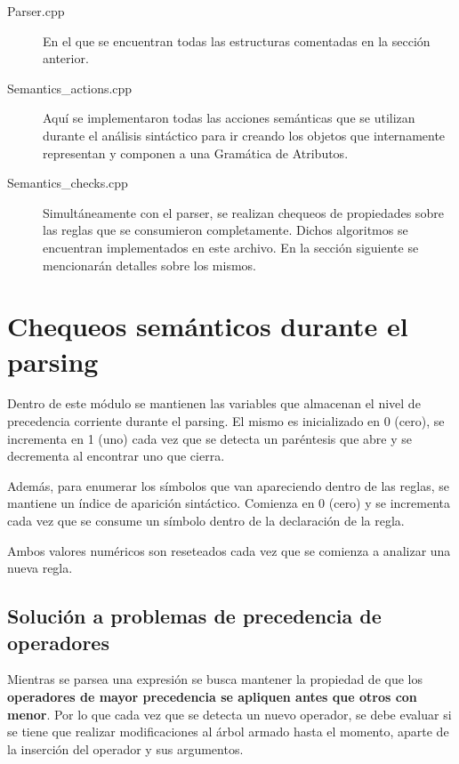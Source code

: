 \begin{description}
\item [Parser.cpp] En el que se encuentran todas las estructuras comentadas en la sección anterior.

\item [Semantics\_actions.cpp] Aquí se implementaron todas las acciones semánticas que se utilizan durante el análisis sintáctico para ir creando los objetos que internamente representan y componen a una Gramática de Atributos.

\item [Semantics\_checks.cpp] Simultáneamente con el parser, se realizan chequeos de propiedades sobre las reglas que se consumieron completamente. Dichos algoritmos se encuentran implementados en este archivo. En la sección siguiente se mencionarán detalles sobre los mismos.
\end{description}

\section{Chequeos semánticos durante el parsing}
\label{sec:checksem}

Dentro de este módulo se mantienen las variables que almacenan el nivel de precedencia corriente durante el parsing. El mismo es inicializado en 0 (cero), se incrementa en 1 (uno) cada vez que se detecta un paréntesis que abre y se decrementa al encontrar uno que cierra.

Además, para enumerar los símbolos que van apareciendo dentro de las reglas, se mantiene un índice de aparición sintáctico. Comienza en 0 (cero) y se incrementa cada vez que se consume un símbolo dentro de la declaración de la regla.

Ambos valores numéricos son reseteados cada vez que se comienza a analizar una nueva regla.

\subsection{Solución a problemas de precedencia de operadores}

Mientras se parsea una expresión se busca mantener la propiedad de que los \textbf{operadores de mayor precedencia se apliquen antes que otros con menor}. Por lo que cada vez que se detecta un nuevo operador, se debe evaluar si se tiene que realizar modificaciones al árbol armado hasta el momento, aparte de la inserción del operador y sus argumentos.

